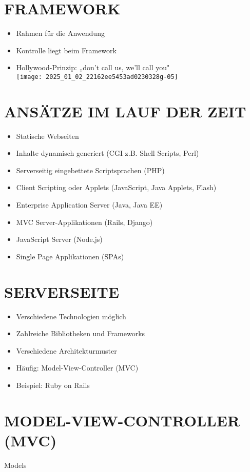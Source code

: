 \section*{FRAMEWORK}
\begin{itemize}
  \item Rahmen für die Anwendung
  \item Kontrolle liegt beim Framework
  \item Hollywood-Prinzip: „don't call us, we'll call you"\\
\texttt{[image: 2025\_01\_02\_22162ee5453ad0230328g-05]}
\end{itemize}

\section*{ANSÄTZE IM LAUF DER ZEIT}
\begin{itemize}
  \item Statische Webseiten
  \item Inhalte dynamisch generiert (CGI z.B. Shell Scripts, Perl)
  \item Serverseitig eingebettete Scriptsprachen (PHP)
  \item Client Scripting oder Applets (JavaScript, Java Applets, Flash)
  \item Enterprise Application Server (Java, Java EE)
  \item MVC Server-Applikationen (Rails, Django)
  \item JavaScript Server (Node.js)
  \item Single Page Applikationen (SPAs)
\end{itemize}

\section*{SERVERSEITE}
\begin{itemize}
  \item Verschiedene Technologien möglich
  \item Zahlreiche Bibliotheken und Frameworks
  \item Verschiedene Architekturmuster
  \item Häufig: Model-View-Controller (MVC)
  \item Beispiel: Ruby on Rails
\end{itemize}

\section*{MODEL-VIEW-CONTROLLER (MVC)}
Models

